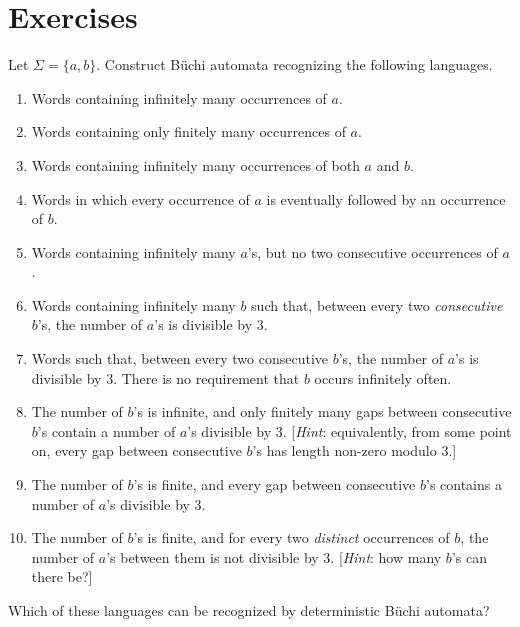 \documentclass[11pt,a4paper]{tutorial}
\begin{document}
\section{Exercises}


\begin{exercise}
Let $\Sigma=\{a,b\}$. Construct Büchi automata recognizing the
following languages.
\begin{enumerate}
\item Words containing infinitely many occurrences of $a$.
\item Words containing only finitely many occurrences of $a$.
\item Words containing infinitely many occurrences of both $a$ and $b$.
\item Words in which every occurrence of $a$ is eventually followed
by an occurrence of $b$.
\item Words containing infinitely many $a$'s, but no two consecutive
occurrences of $a$.
\item Words containing infinitely many $b$ such that, between every two
\emph{consecutive} $b$'s, the number of $a$'s is divisible by $3$.
\item Words such that, between every two consecutive $b$'s, the number
of $a$'s is divisible by $3$. There is no requirement that $b$ occurs
infinitely often.

\item The number of $b$'s is infinite, and only finitely many gaps
between consecutive $b$'s contain a number of $a$'s divisible by $3$.
[\textit{Hint}: equivalently, from some point on, every gap between consecutive $b$'s
has length non-zero modulo $3$.]

\item The number of $b$'s is finite, and every gap between consecutive
$b$'s contains a number of $a$'s divisible by $3$.

\item The number of $b$'s is finite, and for every two \emph{distinct}
occurrences of $b$, the number of $a$'s between them is not divisible
by $3$. [\textit{Hint}: how many $b$'s can there be?]
\end{enumerate}
Which of these languages can be recognized by deterministic Büchi
automata?
\end{exercise}
\end{document}
